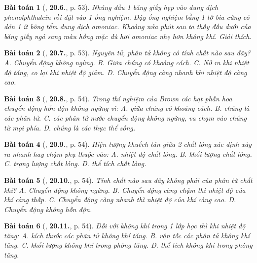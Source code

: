 \documentclass{article}
\numberwithin{equation}{section}
\newtheorem{baitoan}{Bài toán}
\begin{document}
\begin{baitoan}[\cite{SBT_Vat_Ly_8}, \textbf{20.6.}, p. 53]
	Nhúng đầu 1 băng giấy hẹp vào dung dịch phenolphthalein rồi đặt vào 1 ống nghiệm. Đậy ống nghiệm bằng 1 tờ bìa cứng có dán 1 ít bông tẩm dung dịch amoniac. Khoảng nửa phút sau ta thấy đầu dưới của băng giấy ngả sang màu hồng mặc dù hơi amoniac nhẹ hơn không khí. Giải thích.
\end{baitoan}

\begin{baitoan}[\cite{SBT_Vat_Ly_8}, \textbf{20.7.}, p. 53]
	Nguyên tử, phân tử không có tính chất nào sau đây? {\sf A.} Chuyển động không ngừng. {\sf B.} Giữa chúng có khoảng cách. {\sf C.} Nở ra khi nhiệt độ tăng, co lại khi nhiệt độ giảm. {\sf D.} Chuyển động càng nhanh khi nhiệt độ càng cao.
\end{baitoan}

\begin{baitoan}[\cite{SBT_Vat_Ly_8}, \textbf{20.8.}, p. 54]
	Trong thí nghiệm của Brown các hạt phấn hoa chuyển động hỗn độn không ngừng vì: {\sf A.} giữa chúng có khoảng cách. {\sf B.} chúng là các phân tử. {\sf C.} các phân tử nước chuyển động không ngừng, va chạm vào chúng từ mọi phía. {\sf D.} chúng là các thực thể sống.
\end{baitoan}

\begin{baitoan}[\cite{SBT_Vat_Ly_8}, \textbf{20.9.}, p. 54]
	Hiện tượng khuếch tán giữa 2 chất lỏng xác định xảy ra nhanh hay chậm phụ thuộc vào: {\sf A.} nhiệt độ chất lỏng. {\sf B.} khối lượng chất lỏng. {\sf C.} trọng lượng chất lỏng. {\sf D.} thể  tích chất lỏng.
\end{baitoan}

\begin{baitoan}[\cite{SBT_Vat_Ly_8}, \textbf{20.10.}, p. 54]
	Tính chất nào sau đây không phải của phân tử chất khí? {\sf A.} Chuyển động không ngừng. {\sf B.} Chuyển động càng chậm thì nhiệt độ của khí càng thấp. {\sf C.} Chuyển động càng nhanh thì nhiệt độ của khí càng cao. {\sf D.} Chuyển động không hỗn độn.
\end{baitoan}

\begin{baitoan}[\cite{SBT_Vat_Ly_8}, \textbf{20.11.}, p. 54]
	Đối với không khí trong 1 lớp học thì khi nhiệt độ tăng: {\sf A.} kích thước các phân tử không khí tăng. {\sf B.} vận tốc các phân tử không khí tăng. {\sf C.} khối lượng không khí trong phòng tăng. {\sf D.} thể tích không khí trong phòng tăng.
\end{baitoan}
\end{document}
